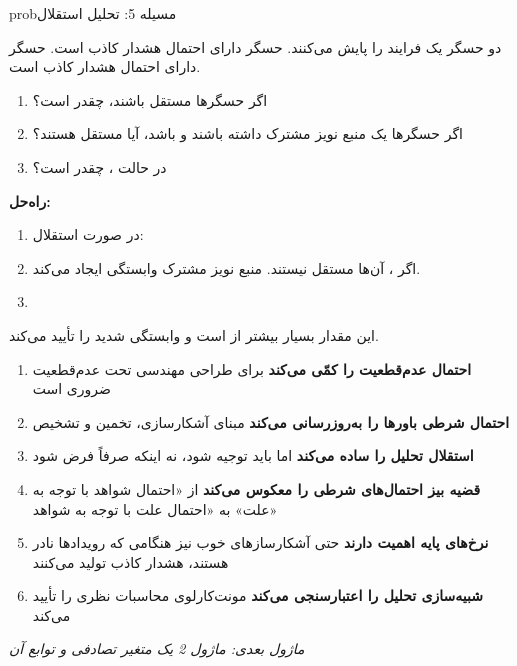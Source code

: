 \begin{PSbox}[unbreakable]{prob}{مسیله 5: تحلیل استقلال}

دو حسگر یک فرایند را پایش می‌کنند. حسگر  دارای احتمال هشدار کاذب  است. حسگر  دارای احتمال هشدار کاذب  است.

\begin{enumerate}
\def\labelenumi{(\PSalph{enumi})}
\tightlist
\item
  اگر حسگرها مستقل باشند،  چقدر است؟
\item
  اگر حسگرها یک منبع نویز مشترک داشته باشند و  باشد، آیا مستقل هستند؟
\item
  در حالت ،  چقدر است؟
\end{enumerate}

\textbf{راه‌حل:}

\begin{enumerate}
\def\labelenumi{(\PSalph{enumi})}
\item
  در صورت استقلال: 
\item
  اگر ، آن‌ها مستقل نیستند. منبع نویز مشترک وابستگی ایجاد می‌کند.
\item
\end{enumerate}

این مقدار بسیار بیشتر از  است و وابستگی شدید را تأیید می‌کند.

\end{PSbox}


\begin{enumerate}
\def\labelenumi{\arabic{enumi}.}
\tightlist
\item
  \textbf{احتمال عدم‌قطعیت را کمّی می‌کند}  برای طراحی مهندسی تحت عدم‌قطعیت ضروری است
\item
  \textbf{احتمال شرطی باورها را به‌روزرسانی می‌کند}  مبنای آشکارسازی، تخمین و تشخیص
\item
  \textbf{استقلال تحلیل را ساده می‌کند}  اما باید توجیه شود، نه اینکه صرفاً فرض شود
\item
  \textbf{قضیه بیز احتمال‌های شرطی را معکوس می‌کند}  از «احتمال شواهد با توجه به علت» به «احتمال علت با توجه به شواهد»
\item
  \textbf{نرخ‌های پایه اهمیت دارند}  حتی آشکارسازهای خوب نیز هنگامی که رویدادها نادر هستند، هشدار کاذب تولید می‌کنند
\item
  \textbf{شبیه‌سازی تحلیل را اعتبارسنجی می‌کند}  مونت‌کارلوی  محاسبات نظری را تأیید می‌کند
\end{enumerate}

\emph{ماژول بعدی: {ماژول 2  یک متغیر تصادفی و توابع آن}}
